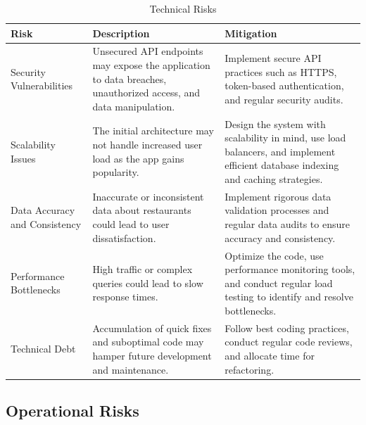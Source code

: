 \documentclass[12pt, a4paper, oneside]{article}
\begin{document}
\begin{table}[H]
\centering
\caption{Technical Risks}
\begin{tabularx}{\textwidth}{|p{}|X|X|}
\hline
\textbf{Risk} & \textbf{Description} & \textbf{Mitigation} \\
\hline
Security Vulnerabilities & Unsecured API endpoints may expose the application to data breaches, unauthorized access, and data manipulation. & Implement secure API practices such as HTTPS, token-based authentication, and regular security audits. \\
\hline
Scalability Issues & The initial architecture may not handle increased user load as the app gains popularity. & Design the system with scalability in mind, use load balancers, and implement efficient database indexing and caching strategies. \\
\hline
Data Accuracy and Consistency & Inaccurate or inconsistent data about restaurants could lead to user dissatisfaction. & Implement rigorous data validation processes and regular data audits to ensure accuracy and consistency. \\
\hline
Performance Bottlenecks & High traffic or complex queries could lead to slow response times. & Optimize the code, use performance monitoring tools, and conduct regular load testing to identify and resolve bottlenecks. \\
\hline
Technical Debt & Accumulation of quick fixes and suboptimal code may hamper future development and maintenance. & Follow best coding practices, conduct regular code reviews, and allocate time for refactoring. \\
\hline
\end{tabularx}
\label{tab:technical-risks}
\end{table}

\subsection{Operational Risks}
\end{document}
